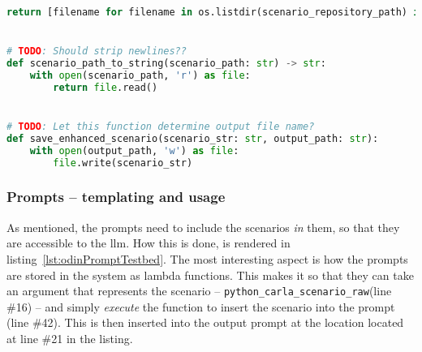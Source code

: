 \begin{lstlisting}[caption={scenario\_utils.py, The implementation of an various scenaro helper functions for executing prompts.}, label={lst:odinScenarioUtils}, language={Python}]
    return [filename for filename in os.listdir(scenario_repository_path) if extension_is_ok(filename)]


# TODO: Should strip newlines??
def scenario_path_to_string(scenario_path: str) -> str:
    with open(scenario_path, 'r') as file:
        return file.read()


# TODO: Let this function determine output file name?
def save_enhanced_scenario(scenario_str: str, output_path: str):
    with open(output_path, 'w') as file:
        file.write(scenario_str)
\end{lstlisting}

\subsubsection{Prompts -- templating and usage}

As mentioned, the prompts need to include the scenarios \emph{in} them, so that
they are accessible to the \acrshort{llm}. How this is done, is rendered in
listing~\ref{lst:odinPromptTestbed}. The most interesting aspect is how the
prompts are stored in the system as lambda functions. This makes it so that they
can take an argument that represents the scenario --
\texttt{python\_carla\_scenario\_raw}(line \#16) -- and simply \emph{execute} the
function to insert the scenario into the prompt (line \#42). This is then
inserted into the output prompt at the location located at line \#21 in the listing.


